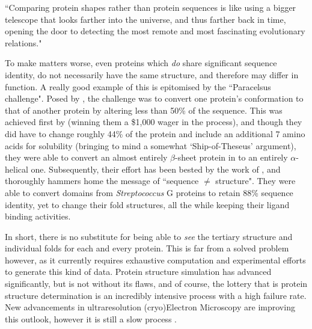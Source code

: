 \begin{displayquote}
``Comparing protein shapes rather than protein sequences is like using a bigger telescope that looks farther into the universe, and thus farther back in time, opening the door to detecting the most remote and most fascinating evolutionary relations."
\end{displayquote}

To make matters worse, even proteins which \emph{do} share significant sequence identity, do not necessarily have the same structure, and therefore may differ in function. A really good example of this is epitomised by the ``Paracelsus challenge". Posed by \cite{Rose1994}, the challenge was to convert one protein's conformation to that of another protein by altering less than 50\% of the sequence. This was achieved first by \cite{Dalal1997} (winning them a \$1,000 wager in the process), and though they did have to change roughly 44\% of the protein and include an additional 7 amino acids for solubility (bringing to mind a somewhat `Ship-of-Theseus' argument), they were able to convert an almost entirely $\beta$-sheet protein in to an entirely $\alpha$-helical one. Subsequently, their effort has been bested by the work of \cite{Alexander2007}, and thoroughly hammers home the message of ``sequence $\neq$ structure". They were able to convert domains from \emph{Streptococcus} G proteins to retain 88\% sequence identity, yet to change their fold structures, all the while keeping their ligand binding activities.

In short, there is no substitute for being able to \emph{see} the tertiary structure and individual folds for each and every protein. This is far from a solved problem however, as it currently requires exhaustive computation and experimental efforts to generate this kind of data. Protein structure simulation has advanced significantly, but is not without its flaws, and of course, the lottery that is protein structure determination is an incredibly intensive process with a high failure rate. New advancements in ultraresolution (cryo)Electron Microscopy are improving this outlook, however it is still a slow process \citep{Kuhlbrandt2014}.

